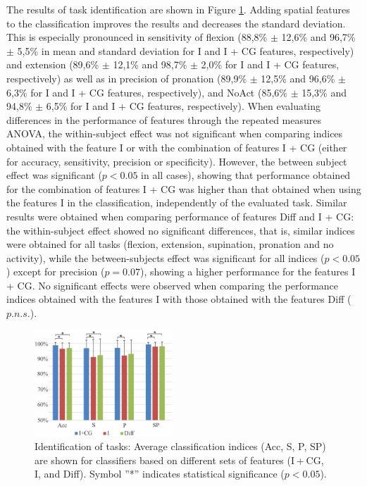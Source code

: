 The results of task identification are shown in Figure \ref{fig:1-3}. Adding spatial features to the classification improves the results and decreases the standard deviation. This is especially pronounced in sensitivity of flexion (88,8\% $\pm$ 12,6\% and 96,7\% $\pm$ 5,5\% in mean and standard deviation for I and I + CG features, respectively) and extension (89,6\% $\pm$ 12,1\% and 98,7\% $\pm$ 2,0\% for I and I + CG features, respectively) as well as in precision of pronation (89,9\% $\pm$ 12,5\% and 96,6\% $\pm$ 6,3\% for I and I + CG features, respectively), and NoAct (85,6\% $\pm$ 15,3\% and 94,8\% $\pm$ 6,5\% for I and I + CG features, respectively). When evaluating differences in the performance of features through the repeated measures ANOVA, the within-subject effect was not significant when comparing indices obtained with the feature I or with the combination of features I + CG (either for accuracy, sensitivity, precision or specificity). However, the between subject effect was significant ($p < 0.05$ in all cases), showing that performance obtained for the combination of features I + CG was higher than that obtained when using the features I in the classification, independently of the evaluated task. Similar results were obtained when comparing performance of features Diff and I + CG: the within-subject effect showed no significant differences, that is, similar indices were obtained for all tasks (flexion, extension, supination, pronation and no activity), while the between-subjects effect was significant for all indices ($p < 0.05$) except for precision ($p = 0.07$), showing a higher performance for the features I + CG. No significant effects were observed when comparing the performance indices obtained with the features I with those obtained with the features Diff ($p.n.s.$).

\begin{figure}[ht]
\centering
\includegraphics[width=0.459\textwidth]{Images/figure1_3.png}
\caption{Identification of tasks: Average classification indices (Acc, S, P, SP) are shown for classifiers based on different sets of features (I + CG, I, and Diff). Symbol ”*” indicates statistical significance ($p < 0.05$).}
\label{fig:1-3}
\end{figure}      

